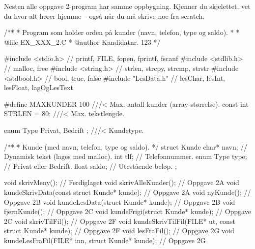 

Nesten alle oppgave 2-program har samme oppbygning. Kjenner du skjelettet,
vet du hvor alt hører hjemme -- også når du må skrive noe fra scratch.

\begin{kode}
/**
 *   Program som holder orden på kunder (navn, telefon, type og saldo).
 *
 *   @file     EX_XXX_2.C
 *   @author   Kandidatnr. 123
 */

#include <stdio.h>               //  printf, FILE, fopen, fprintf, fscanf
#include <stdlib.h>              //  malloc, free
#include <string.h>              //  strlen, strcpy, strcmp, strstr
#include <stdbool.h>             //  bool, true, false
#include "LesData.h"             //  lesChar, lesInt, lesFloat, lagOgLesText

#define   MAXKUNDER   100        ///<  Max. antall kunder (array-størrelse).
const int STRLEN    =  80;       ///<  Max. tekstlengde.

enum Type { Privat, Bedrift };   ///<  Kundetype.

/**
 *  Kunde (med navn, telefon, type og saldo).
 */
struct Kunde {
  char*     navn;                //  Dynamisk tekst (lages med malloc).
  int       tlf;                 //  Telefonnummer.
  enum Type type;                //  Privat eller Bedrift.
  float     saldo;               //  Utestående beløp.
};

void skrivMeny();                                              //  Ferdiglaget
void skrivAlleKunder();                                        //  Oppgave 2A
void kundeSkrivData(const struct Kunde* kunde);                //  Oppgave 2A
void nyKunde();                                                //  Oppgave 2B
void kundeLesData(struct Kunde* kunde);                        //  Oppgave 2B
void fjernKunde();                                             //  Oppgave 2C
void kundeFrigi(struct Kunde* kunde);                          //  Oppgave 2C
void skrivTilFil();                                            //  Oppgave 2F
void kundeSkrivTilFil(FILE* ut, const struct Kunde* kunde);    //  Oppgave 2F
void lesFraFil();                                              //  Oppgave 2G
void kundeLesFraFil(FILE* inn, struct Kunde* kunde);           //  Oppgave 2G


\end{kode}
